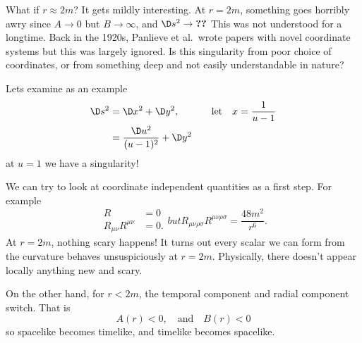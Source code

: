 What if $r\approx 2m$? It gets mildly interesting. At $r=2m$,
something goes horribly awry since $A\to0$ but $B\to\infty$, and
$\D s^{2}\to\textbf{??}$ This was not understood for a
longtime. Back in the 1920s, Panlieve et al.~wrote papers with
novel coordinate systems but this was largely ignored. 
Is this singularity from poor choice of coordinates, or from
something deep and not easily understandable in nature?

Lets examine as an example
\begin{equation}
\begin{aligned}
\D s^{2}&= \D x^{2}+\D y^{2}, &\quad &\mbox{let}\quad
x=\frac{1}{u-1}\\
&=\frac{\D u^{2}}{(u-1)^{2}}+\D y^{2}
\end{aligned}
\end{equation}
at $u=1$ we have a singularity! 

We can try to look at coordinate independent quantities as a
first step. For example
\begin{subequations}
\begin{align}
R &= 0\\
R_{\mu\nu}R^{\mu\nu} &=0.
\end{align}
but
\begin{equation}
R_{\mu\nu\rho\sigma}R^{\mu\nu\rho\sigma}=\frac{48m^{2}}{r^{6}}.
\end{equation}
\end{subequations}
At $r=2m$, nothing scary happens! It turns out every scalar we
can form from the curvature behaves unsuspiciously at
$r=2m$. Physically, there doesn't appear locally anything new and
scary. 

On the other hand, for $r<2m$, the temporal component and radial
component switch. That is
\begin{equation}
A(r)<0,\quad\mbox{and}\quad B(r)<0
\end{equation}
so spacelike becomes timelike, and timelike becomes spacelike.
